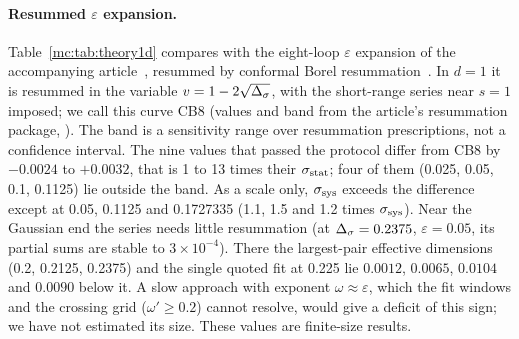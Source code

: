 \paragraph{Resummed $\varepsilon$ expansion.} Table~\ref{mc:tab:theory1d} compares with the eight-loop $\varepsilon$ expansion of the accompanying
article~\cite{mc:Zheng:2026ai}, resummed by conformal Borel resummation~\cite{mc:LeGuillou:1979ixc}. In $d=1$ it is resummed in the variable
$v=1-2\sqrt{\Delta_\sigma}$, with the short-range series near $s=1$ imposed; we call this curve CB8 (values and band from the article's resummation
package, ). The band is a sensitivity range over resummation prescriptions, not a confidence interval.
The nine values that passed the protocol differ from CB8 by $-0.0024$ to $+0.0032$, that is 1 to 13 times their $\sigma_{\rm stat}$; four of them (0.025,
0.05, 0.1, 0.1125) lie outside the band. As a scale only, $\sigma_{\rm sys}$ exceeds the difference except at 0.05, 0.1125 and 0.1727335 (1.1, 1.5 and 1.2
times $\sigma_{\rm sys}$). Near the Gaussian end the series needs little resummation (at $\Delta_\sigma=0.2375$, $\varepsilon=0.05$, its partial sums are stable to
$3\times10^{-4}$). There the largest-pair effective dimensions (0.2, 0.2125, 0.2375) and the single quoted fit at 0.225 lie $0.0012$,
$0.0065$, $0.0104$ and $0.0090$ below it. A slow approach with exponent $\omega\approx\varepsilon$, which the fit windows and the crossing grid
($\omega'\ge0.2$) cannot resolve, would give a deficit of this sign; we have not estimated its size. These values are finite-size results.
